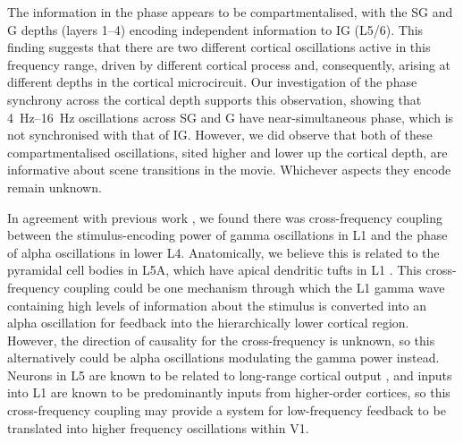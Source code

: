 The information in the phase appears to be compartmentalised, with the \ac{SG} and \ac{G} depths (layers 1--4) encoding independent information to \ac{IG} (\acl{L5/6}).
This finding suggests that there are two different cortical oscillations active in this frequency range, driven by different cortical process and, consequently, arising at different depths in the cortical microcircuit.
Our investigation of the phase synchrony across the cortical depth supports this observation, showing that \SIrange{4}{16}{Hz} oscillations across \ac{SG} and \ac{G} have near-simultaneous phase, which is not synchronised with that of \ac{IG}.
However, we did observe that both of these compartmentalised oscillations, sited higher and lower up the cortical depth, are informative about scene transitions in the movie.
Whichever aspects they encode remain unknown.

In agreement with previous work \citep{Spaak2012}, we found there was cross-frequency coupling between the stimulus-encoding power of gamma oscillations in \acs{L1} and the phase of alpha oscillations in lower \acs{L4}.
Anatomically, we believe this is related to the pyramidal cell bodies in \acs{L5A}, which have apical dendritic tufts in \acs{L1} \citep{Hill2013,Zhu2004}.
This cross-frequency coupling could be one mechanism through which the \acs{L1} gamma wave containing high levels of information about the stimulus is converted into an alpha oscillation for feedback into the hierarchically lower cortical region.
However, the direction of causality for the cross-frequency is unknown, so this alternatively could be alpha oscillations modulating the gamma power instead.
Neurons in \acs{L5} are known to be related to long-range cortical output \citep{Hill2013}, and inputs into \acs{L1} are known to be predominantly inputs from higher-order cortices, so this cross-frequency coupling may provide a system for low-frequency feedback to be translated into higher frequency oscillations within \ac{V1}.
